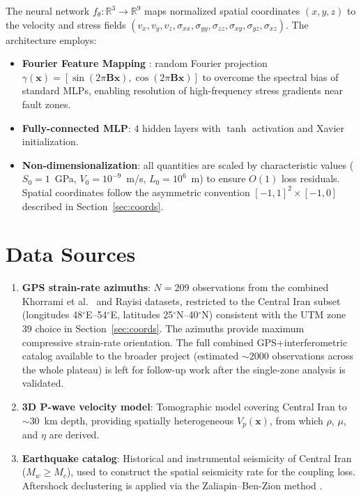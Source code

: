 \documentclass[11pt, a4paper]{article}
\begin{document}
The neural network $f_\theta : \mathbb{R}^3 \to \mathbb{R}^9$ maps normalized spatial coordinates $(x, y, z)$ to the velocity and stress fields $(v_x, v_y, v_z, \sigma_{xx}, \sigma_{yy}, \sigma_{zz}, \sigma_{xy}, \sigma_{yz}, \sigma_{xz})$. The architecture employs:
\begin{itemize}
    \item \textbf{Fourier Feature Mapping} \cite{Tancik2020}: random Fourier projection $\gamma(\mathbf{x}) = [\sin(2\pi\mathbf{B}\mathbf{x}), \cos(2\pi\mathbf{B}\mathbf{x})]$ to overcome the spectral bias of standard MLPs, enabling resolution of high-frequency stress gradients near fault zones.
    \item \textbf{Fully-connected MLP}: 4 hidden layers with $\tanh$ activation and Xavier initialization.
    \item \textbf{Non-dimensionalization}: all quantities are scaled by characteristic values ($S_0 = 1$~GPa, $V_0 = 10^{-9}$~m/s, $L_0 = 10^6$~m) to ensure $O(1)$ loss residuals. Spatial coordinates follow the asymmetric convention $[-1, 1]^2 \times [-1, 0]$ described in Section~\ref{sec:coords}.
\end{itemize}

\section{Data Sources}

\begin{enumerate}
    \item \textbf{GPS strain-rate azimuths}: $N = 209$ observations from the combined Khorrami et al.\ \cite{Khorrami2019} and Rayisi \cite{Rayisi2016} datasets, restricted to the Central Iran subset (longitudes 48$^\circ$E--54$^\circ$E, latitudes 25$^\circ$N--40$^\circ$N) consistent with the UTM zone 39 choice in Section~\ref{sec:coords}. The azimuths provide maximum compressive strain-rate orientation. The full combined GPS+interferometric catalog available to the broader project (estimated $\sim 2000$ observations across the whole plateau) is left for follow-up work after the single-zone analysis is validated.
    \item \textbf{3D P-wave velocity model}: Tomographic model covering Central Iran to $\sim$30~km depth, providing spatially heterogeneous $V_p(\mathbf{x})$, from which $\rho$, $\mu$, and $\eta$ are derived.
    \item \textbf{Earthquake catalog}: Historical and instrumental seismicity of Central Iran ($M_w \geq M_c$), used to construct the spatial seismicity rate for the coupling loss. Aftershock declustering is applied via the Zaliapin--Ben-Zion method \cite{Zaliapin2008}.
\end{enumerate}
\end{document}
